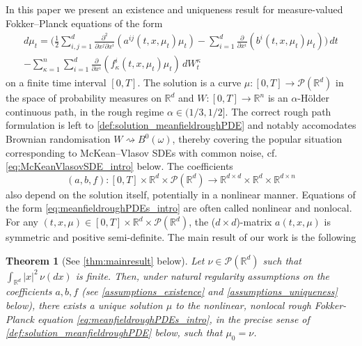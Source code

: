 \documentclass[10pt, a4paper]{article} %
\newcommand{\R}{\mathbb{R}}
\theoremstyle{definition}
\theoremstyle{plain}
\newtheorem*{teoremasingolo}{Theorem}
\begin{document}
In this paper we present an existence and uniqueness result for measure-valued Fokker--Planck equations of the form
\begin{multline} \label{eq:meanfieldroughPDEs_intro}
        d\mu_t = \Bigg(\frac{1}{2} \sum_{i,j=1}^d \frac{\partial^2}{\partial x^j \partial x^i} (a^{ij}(t,x,\mu_t) \mu_t) - \sum_{i=1}^d \frac{\partial}{\partial x^i} (b^i(t,x,\mu_t)\mu_t) \Bigg) \, dt  \\ - \sum_{\kappa=1}^n  \sum_{i=1}^d \frac{\partial}{\partial x^i} (f_\kappa^i(t,x,\mu_t) \mu_t) \, dW^\kappa_t
\end{multline}
on a finite time interval $[0,T]$.
The solution is a curve $\mu:[0,T] \to \mathcal{P}(\R^d)$ in the space of probability measures on $\R^d$ and $W:[0,T] \to \R^n$ is an $\alpha$-H\"older continuous path, in the rough regime $\alpha \in (1/3,1/2]$. The correct rough path formulation is left to \cref{def:solution_meanfieldroughPDE} and notably accomodates Brownian randomisation $W \rightsquigarrow B^0 (\omega)$, thereby covering the popular situation {corresponding to} McKean--Vlasov SDEs with common noise, cf. \eqref{eq:McKeanVlasovSDE_intro} below.  
The coefficients \begin{equation*}
    (a,b,f): [0,T] \times \R^d \times \mathcal{P}(\R^d) \to \R^{d \times d} \times \R^d \times \R^{d \times n} 
\end{equation*} 
also depend on the solution itself, potentially in a nonlinear manner. Equations of the form \eqref{eq:meanfieldroughPDEs_intro} are often called nonlinear and nonlocal.  
For any $(t,x,\mu) \in [0,T] \times \R^d \times \mathcal{P}(\R^d)$, the ($d\times d$)-matrix $a(t,x,\mu)$ is symmetric and positive semi-definite. 
The main result of our work is the following 

\begin{teoremasingolo}[See \cref{thm:mainresult} below] Let $\nu \in \mathcal{P}(\R^d)$ such that $\int_{\R^d} |x|^2 \, \nu(dx)$ is finite. Then, under natural regularity assumptions on the coefficients $a,b,f$ (see \cref{assumptions_existence} and \cref{assumptions_uniqueness} below), there exists a unique solution $\mu$ to the {\em nonlinear, nonlocal rough Fokker-Planck equation} \eqref{eq:meanfieldroughPDEs_intro}, in the precise sense of \cref{def:solution_meanfieldroughPDE} below, such that $\mu_0=\nu$.      
\end{teoremasingolo} \medskip
\end{document}
